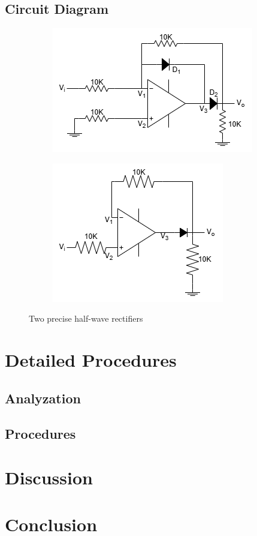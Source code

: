     \subsection{Circuit Diagram}
    \begin{figure}[h]
    \centering
    \begin{subfigure}[h]{0.45\textwidth}
        \centering
        \includegraphics[width=0.7\linewidth]{Lab12/Lab12a.drawio.png}
        \caption{}
        \label{lab5a}
        \end{subfigure}
    \hfill
        \begin{subfigure}[h]{0.45\textwidth}
        \centering
        \includegraphics[width=0.7\linewidth]{Lab12/Lab12b.drawio.png}
        \caption{}
        \label{lab5b}
        \end{subfigure}
    \caption{Two precise half-wave rectifiers}
    \label{lab12f}
    \end{figure}
    \FloatBarrier

\section{Detailed Procedures}
    \subsection{Analyzation}


    \subsection{Procedures}

    
\section{Discussion}


\section{Conclusion}